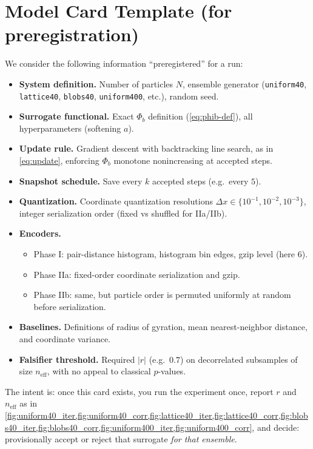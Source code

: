 \documentclass[11pt,a4paper]{article}
\numberwithin{equation}{section}
\newcommand{\phib}{\Phi_b}
\begin{document}
\section{Model Card Template (for preregistration)}
We consider the following information ``preregistered'' for a run:
\begin{itemize}
\item \textbf{System definition.}  
Number of particles $N$, ensemble generator (\texttt{uniform40}, \texttt{lattice40}, \texttt{blobs40}, \texttt{uniform400}, etc.), random seed.

\item \textbf{Surrogate functional.}  
Exact $\phib$ definition (\cref{eq:phib-def}), all hyperparameters (softening $a$).

\item \textbf{Update rule.}  
Gradient descent with backtracking line search, as in \cref{eq:update}, enforcing $\phib$ monotone nonincreasing at accepted steps.

\item \textbf{Snapshot schedule.}  
Save every $k$ accepted steps (e.g.\ every $5$).

\item \textbf{Quantization.}  
Coordinate quantization resolutions $\Delta x \in \{10^{-1},10^{-2},10^{-3}\}$, integer serialization order (fixed vs shuffled for IIa/IIb).

\item \textbf{Encoders.}
  \begin{itemize}
  \item Phase I: pair-distance histogram, histogram bin edges, gzip level (here 6).
  \item Phase IIa: fixed-order coordinate serialization and gzip.
  \item Phase IIb: same, but particle order is permuted uniformly at random before serialization.
  \end{itemize}

\item \textbf{Baselines.}  
Definitions of radius of gyration, mean nearest-neighbor distance, and coordinate variance.

\item \textbf{Falsifier threshold.}  
Required $|r|$ (e.g.\ $0.7$) on decorrelated subsamples of size $n_{\text{eff}}$, with no appeal to classical $p$-values.
\end{itemize}

The intent is: once this card exists, you run the experiment once, report $r$ and $n_{\text{eff}}$ as in \cref{fig:uniform40_iter,fig:uniform40_corr,fig:lattice40_iter,fig:lattice40_corr,fig:blobs40_iter,fig:blobs40_corr,fig:uniform400_iter,fig:uniform400_corr}, and decide: provisionally accept or reject that surrogate \emph{for that ensemble}.
\end{document}
